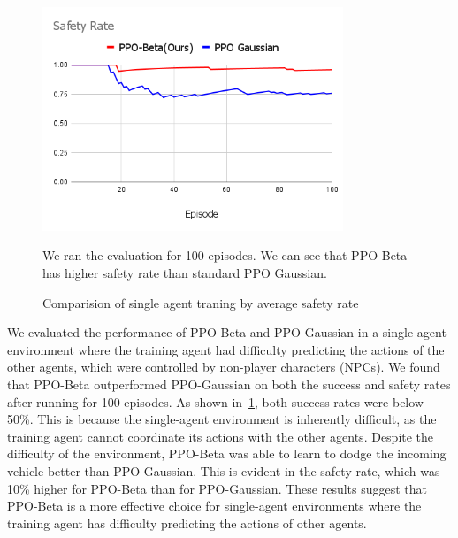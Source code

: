\begin{figure}[H]
    \centering
    \includegraphics[width=9cm]{assets/single_safety}
    \caption{Comparision of single agent traning by average safety rate}\label{fig:figure6}
    \medskip
    \small We ran the evaluation for 100 episodes.
    We can see that PPO Beta has higher safety rate than standard PPO Gaussian.
\end{figure}
We evaluated the performance of PPO-Beta and PPO-Gaussian in a single-agent environment where the training
agent had difficulty predicting the actions of the other agents,
which were controlled by non-player characters (NPCs). We
found that PPO-Beta outperformed PPO-Gaussian on both the
success and safety rates after running for 100 episodes. As
shown in~\cref{fig:figure6}, both success rates were below 50\%.
This is because the single-agent environment is inherently difficult,
as the training agent cannot coordinate its actions with the
other agents.
Despite the difficulty of the environment, PPO-Beta was able to learn to dodge the incoming vehicle better
than PPO-Gaussian. This is evident in the safety rate, which
was 10\% higher for PPO-Beta than for PPO-Gaussian. These
results suggest that PPO-Beta is a more effective choice for
single-agent environments where the training agent has
difficulty predicting the actions of other agents.


